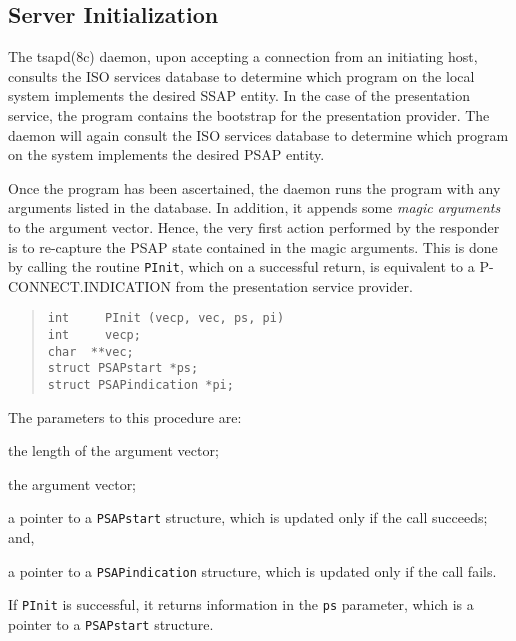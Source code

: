 \subsection	{Server Initialization}
The \man tsapd(8c) daemon,
upon accepting a connection from an initiating host,
consults the ISO services database to determine which program
on the local system implements the desired SSAP entity.
In the case of the presentation service,
the  program contains the bootstrap for the presentation provider.
The daemon will again consult the ISO services database to determine which
program on the system implements the desired PSAP entity.

Once the program has been ascertained,
the daemon runs the program with any arguments listed in the database.
In addition,
it appends some {\em magic arguments\/} to the argument vector.
Hence,
the very first action performed by the responder is to re-capture the PSAP
state contained in the magic arguments.
This is done by calling the routine \verb"PInit",
which on a successful return,
is equivalent to a {\sf P-CONNECT.INDICATION\/} from the presentation service
provider.
\begin{quote}\small\begin{verbatim}
int     PInit (vecp, vec, ps, pi)
int     vecp;
char  **vec;
struct PSAPstart *ps;
struct PSAPindication *pi;
\end{verbatim}\end{quote}
The parameters to this procedure are:
\begin{describe}
\item[\verb"vecp":] the length of the argument vector;

\item[\verb"vec":] the argument vector;

\item[\verb"ps":] a pointer to a \verb"PSAPstart" structure, which is updated
only if the call succeeds;
and,

\item[\verb"pi":] a pointer to a \verb"PSAPindication" structure, which is
updated only if the call fails.
\end{describe}
If \verb"PInit" is successful,
it returns information in the \verb"ps" parameter,
which is a pointer to a \verb"PSAPstart" structure.
